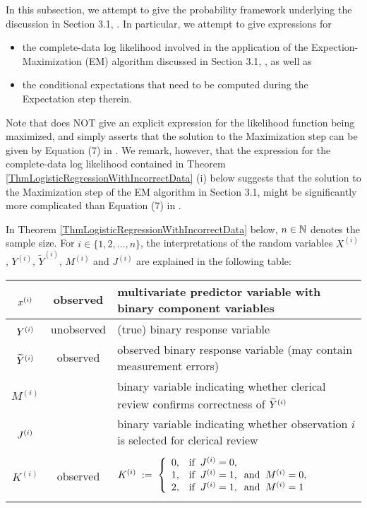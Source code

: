 \vskip 0.3cm
In this subsection, we attempt to give the probability framework underlying the discussion
in Section 3.1, \cite{Chipperfield2011}.
In particular, we attempt to give expressions for 
\begin{itemize}
\item
	the complete-data log likelihood involved in the application
	of the Expection-Maximization (EM) algorithm discussed in
	Section 3.1, \cite{Chipperfield2011}, as well as
\item
	the conditional expectations that need to be computed during the Expectation step therein.
\end{itemize}
Note that \cite{Chipperfield2011} does NOT give an explicit
expression for the likelihood function being maximized, and simply
asserts that the solution to the Maximization step can be given by
Equation (7) in \cite{Chipperfield2011}.
We remark, however, that the expression for the complete-data log likelihood
contained in Theorem \ref{ThmLogisticRegressionWithIncorrectData} (i) below
suggests that the solution to the Maximization step of the EM algorithm
in Section 3.1, \cite{Chipperfield2011} might be significantly more complicated than
Equation (7) in \cite{Chipperfield2011}.

\vskip 0.3cm
\noindent
In Theorem \ref{ThmLogisticRegressionWithIncorrectData} below,
$n \in \mathbb{N}$ denotes the sample size.
For $i \in \{1,2,\ldots,n\}$, the interpretations of the random variables
$X^{(i)}$, $Y^{(i)}$, $\widetilde{Y}^{(i)}$, $M^{(i)}$ and $J^{(i)}$
are explained in the following table:
\begin{center}
\begin{tabular}{|c|c|l|}
\hline
$\overset{{\color{white}.}}{x^{(i)}}$ & observed & multivariate predictor variable with binary component variables
\\ \hline
$\overset{{\color{white}.}}{Y^{(i)}}$ & unobserved & (true) binary response variable
\\ \hline
$\overset{{\color{white}.}}{\widetilde{Y}^{(i)}}$ & observed & observed binary response variable (may contain measurement errors)
\\ \hline
$M^{(i)}$ & & binary variable indicating whether clerical review confirms correctness of $\overset{{\color{white}.}}{\widetilde{Y}^{(i)}}$
\\ \hline
$\overset{{\color{white}.}}{J^{(i)}}$ & & binary variable indicating whether observation $i$ is selected for clerical review
\\ \hline
&& \\
$K^{(i)}$ & observed & $K^{(i)} \;:=\;
	\left\{\begin{array}{cl}
		0, & \textnormal{if}\;\; J^{(i)} = 0,
		\\
		1, & \textnormal{if}\;\; J^{(i)} = 1, \;\;\textnormal{and}\;\; M^{(i)} = 0,
		\\
		2, & \textnormal{if}\;\; J^{(i)} = 1, \;\;\textnormal{and}\;\; M^{(i)} = 1
	\end{array}\right.$
\\
&& \\
\hline
\end{tabular}
\end{center}

